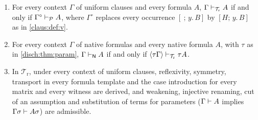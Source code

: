 \begin{lemma}
\label{disch:lem:alias-tr}
\begin{enumerate}[label=\textup{(\alph*)}]
\item For every context $\Gamma$ of uniform clauses and every formula $A$,
 $\Gamma\vdash_{\mathcal T_{\mathrm r}}A$ if and only if
 $\Gamma^{\circ}\vdash_{\mathcal P}A$, where $\Gamma^{\circ}$ replaces
 every occurrence $[\ ;\,y.\,B]$ by $[H;\,y.\,B]$ as in
 \cref{claus:def:v}.
\item For every context $\Gamma$ of native formulas and every native
 formula $A$, with $\tau$ as in \cref{disch:thm:param},
 $\Gamma\vdash_{\mathsf{N}}A$ if and only if
 $\langle\tau\Gamma\rangle\vdash_{\mathcal T_{\mathrm r}}\tau A$.
\item In $\mathcal T_{\mathrm r}$, under every context of uniform clauses,
 reflexivity, symmetry, transport in every formula template and the case
 introduction for every matrix and every witness are derived, and
 weakening, injective renaming, cut of an assumption and substitution of
 terms for parameters ($\Gamma\vdash A$ implies
 $\Gamma\sigma\vdash A\sigma$) are admissible.
\end{enumerate}
\end{lemma}

